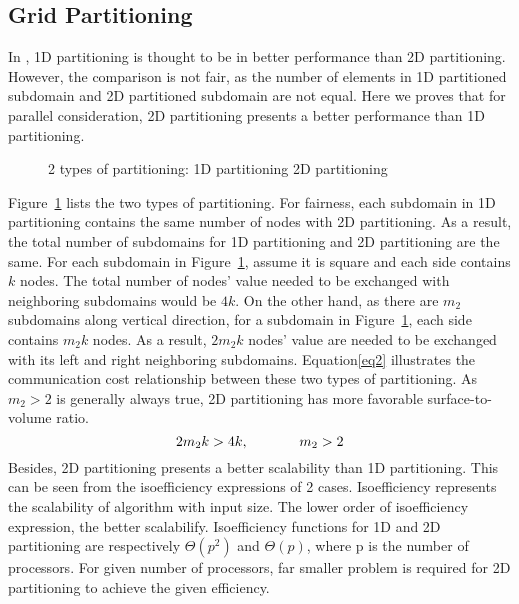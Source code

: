 \documentclass{sig-alternate}
\begin{document}
  \subsection{Grid Partitioning}
	In \cite{Zhongyu}, 1D partitioning is thought to be in better performance than 2D partitioning. However, the comparison is not 
	fair, as the number of elements in 1D partitioned subdomain and 2D partitioned subdomain are not equal. Here we proves that
	for parallel consideration, 2D partitioning presents a better performance than 1D partitioning. 

	\begin{figure}[htbp]
	  \caption{2 types of partitioning:
	   1D partitioning
	   2D partitioning }
	  \label{Fig3}
	\end{figure}
	Figure~\ref{Fig3} lists the two types of partitioning. For fairness, each subdomain in 1D partitioning contains the 
	same number of nodes with 2D partitioning. As a result, the total number of subdomains for 1D partitioning and 2D partitioning are the same. For 
	each subdomain 
	in Figure~\ref{Fig3}, assume  it is square and each side contains $k$ nodes. The total 
	number of nodes' value needed to be exchanged with neighboring subdomains would be $4k$. On the other hand, as 
	there are $m_2$ subdomains along vertical direction, for a subdomain in Figure~\ref{Fig3}, each side contains
	$m_2k$ nodes. As a result, $2m_2k$ nodes' value are needed to be exchanged with its left and right 
	neighboring subdomains. Equation\eqref{eq2} illustrates the communication cost relationship between these two types of
	partitioning. As $m_2>2$ is generally always true, 2D partitioning has more favorable surface-to-volume ratio.    
	\begin{equation}
		2m_2k > 4k, \hspace{0.5 in} m_2 > 2 \label{eq2}
	\end{equation}
	Besides, 2D partitioning presents a better scalability than 1D partitioning. This can be
	seen from the isoefficiency expressions of 2 cases. Isoefficiency represents the scalability of algorithm
	with input size. The lower order of isoefficiency expression, the better scalabilify. Isoefficiency functions for 1D 
	and 2D partitioning are respectively $\Theta(p^2)$ and $\Theta(p)$\cite{Grama, Kumar}, where p is the number of processors. 
	For given number of processors, far smaller problem is required for 2D partitioning to achieve the given efficiency.
\end{document}
